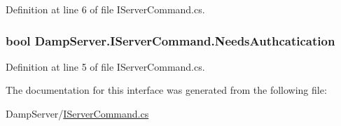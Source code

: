 Definition at line 6 of file I\-Server\-Command.\-cs.

\hypertarget{interface_damp_server_1_1_i_server_command_ac0c06b3f2ab47f29902ffb507c8e1019}{
\subsubsection[{Needs\-Authcatication}]{\setlength{\rightskip}{0pt plus 5cm}bool Damp\-Server.\-I\-Server\-Command.\-Needs\-Authcatication\hspace{0.3cm}{\ttfamily [get]}}}\label{interface_damp_server_1_1_i_server_command_ac0c06b3f2ab47f29902ffb507c8e1019}


Definition at line 5 of file I\-Server\-Command.\-cs.



The documentation for this interface was generated from the following file\-:\begin{DoxyCompactItemize}
\item 
Damp\-Server/\hyperlink{_i_server_command_8cs}{I\-Server\-Command.\-cs}\end{DoxyCompactItemize}
